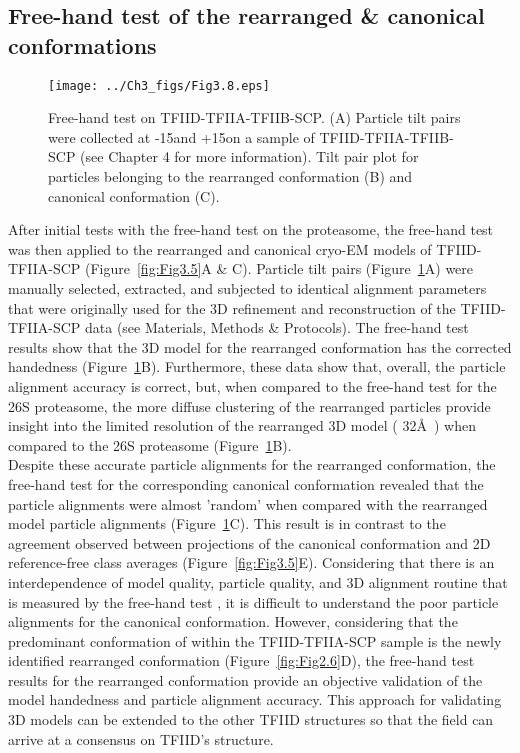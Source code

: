 \subsection{Free-hand test of the rearranged \& canonical conformations}
\begin{figure}
\centering
\texttt{[image: ../Ch3\_figs/Fig3.8.eps]}
\caption[Free-hand test on TFIID-TFIIA-TFIIB-SCP]{Free-hand test on TFIID-TFIIA-TFIIB-SCP. (A) Particle tilt pairs were collected at -15\textdegree and +15\textdegree on a sample of TFIID-TFIIA-TFIIB-SCP (see Chapter 4 for more information). Tilt pair plot for particles belonging to the rearranged conformation (B) and canonical conformation (C). }
\label{fig:Fig3.8}
\end{figure}
After initial tests with the free-hand test on the proteasome, the free-hand test was then applied to the rearranged and canonical cryo-EM models of TFIID-TFIIA-SCP (Figure~\ref{fig:Fig3.5}A \& C). Particle tilt pairs (Figure~\ref{fig:Fig3.8}A) were manually selected, extracted, and subjected to identical alignment parameters that were originally used for the 3D refinement and reconstruction of the TFIID-TFIIA-SCP data (see Materials, Methods \& Protocols). The free-hand test results show that the 3D model for the rearranged conformation has the corrected handedness (Figure~\ref{fig:Fig3.8}B). Furthermore, these data show that, overall, the particle alignment accuracy is correct, but, when compared to the free-hand test for the 26S proteasome, the more diffuse clustering of the rearranged particles provide insight into the limited resolution of the rearranged 3D model ( 32\AA\ ) when compared to the 26S proteasome (Figure~\ref{fig:Fig3.8}B).\\ 
\indent Despite these accurate particle alignments for the rearranged conformation, the free-hand test for the corresponding canonical conformation revealed that the particle alignments were almost 'random' when compared with the rearranged model particle alignments (Figure~\ref{fig:Fig3.8}C). This result is in contrast to the agreement observed between projections of the canonical conformation and 2D reference-free class averages (Figure~\ref{fig:Fig3.5}E). Considering that there is an interdependence of model quality, particle quality, and 3D alignment routine that is measured by the free-hand test \cite{Baker_2012,Henderson_2011,Lau_2010}, it is difficult to understand the poor particle alignments for the canonical conformation. However, considering that the predominant conformation of within the TFIID-TFIIA-SCP sample is the newly identified rearranged conformation (Figure~\ref{fig:Fig2.6}D), the free-hand test results for the rearranged conformation provide an objective validation of the model handedness and particle alignment accuracy. This approach for validating 3D models can be extended to the other TFIID structures  \cite{Elmlund_691,Leurent_1554,Leurent_1797,Papai_539,Papai_418} so that the field can arrive at a consensus on TFIID's structure.  
  
